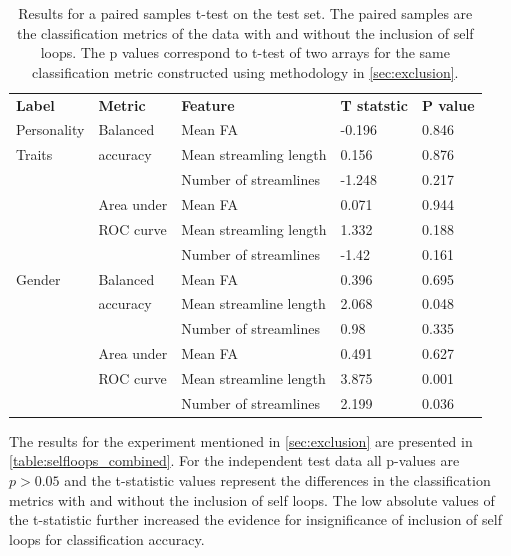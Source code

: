 \documentclass[msthesis.tex]{subfiles}
\begin{document}
\begin{table}
\begin{tabular}{|p{}|l|l|l|l|}
\thickhline
 \large \textbf{Label}&  \large \textbf{Metric}&  \large \textbf{Feature}&  \large \textbf{T statstic}&  \large \textbf{P value}\\
\thickhline
Personality&Balanced&Mean FA&-0.196&0.846\\
Traits&accuracy&Mean streamling length&0.156&0.876\\
&&Number of streamlines &-1.248&0.217\\
&Area under &Mean FA&0.071&0.944\\
&ROC curve&Mean streamling length&1.332&0.188\\
&&Number of streamlines&-1.42&0.161\\
\thickhline
Gender&Balanced&Mean FA&0.396&0.695\\
&accuracy&Mean streamline length&2.068&0.048\\
&&Number of streamlines&0.98&0.335\\
&Area under &Mean FA&0.491&0.627\\
&ROC curve&Mean streamline length&3.875&0.001\\
&&Number of streamlines&2.199&0.036\\
\hline
\end{tabular}
\caption{Results for a paired samples t-test on the test set. The paired samples are the classification metrics of the data with and without the inclusion of self loops. The p values correspond to t-test of two arrays for the same classification metric constructed using methodology in \autoref{sec:exclusion}.}
\label{table:selfloops_combined}
\end{table}


The results for the experiment mentioned in \autoref{sec:exclusion} are presented in  \autoref{table:selfloops_combined}. For the independent test data all p-values are $p>0.05$ and the t-statistic values represent the differences in the classification metrics with and without the inclusion of self loops. The low absolute values of the t-statistic further increased the evidence for insignificance of inclusion of self loops for classification accuracy.
\end{document}
